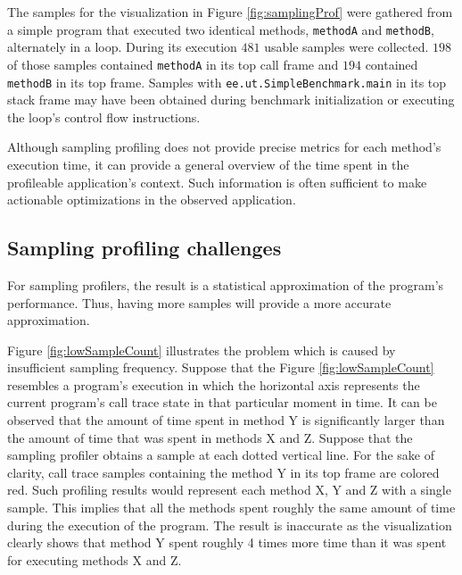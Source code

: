 \documentclass[..thesis.tex]{subfiles}
\begin{document}
The samples for the visualization in Figure \ref{fig:samplingProf} were gathered from a simple program that executed two identical methods, \texttt{methodA} and \texttt{methodB}, alternately in a loop. During its execution $481$ usable samples were collected. $198$ of those samples contained \texttt{methodA} in its top call frame and $194$ contained \texttt{methodB} in its top frame. Samples with \texttt{ee.ut.SimpleBenchmark.main} in its top stack frame may have been obtained during benchmark initialization or executing the loop's control flow instructions.

Although sampling profiling does not provide precise metrics for each method's execution time, it can provide a general overview of the time spent in the profileable application's context. Such information is often sufficient to make actionable optimizations in the observed application.

\subsection{Sampling profiling challenges}

For sampling profilers, the result is a statistical approximation of the program's performance. Thus, having more samples will provide a more accurate approximation. 

Figure \ref{fig:lowSampleCount} illustrates the problem which is caused by insufficient sampling frequency. Suppose that the Figure \ref{fig:lowSampleCount} resembles a program's execution in which the horizontal axis represents the current program's call trace state in that particular moment in time. It can be observed that the amount of time spent in method Y is significantly larger than the amount of time that was spent in methods X and Z. Suppose that the sampling profiler obtains a sample at each dotted vertical line. For the sake of clarity, call trace samples containing the method Y in its top frame are colored red. Such profiling results would represent each method X, Y and Z with a single sample. This implies that all the methods spent roughly the same amount of time during the execution of the program. The result is inaccurate as the visualization clearly shows that method Y spent roughly 4 times more time than it was spent for executing methods X and Z.
\end{document}
